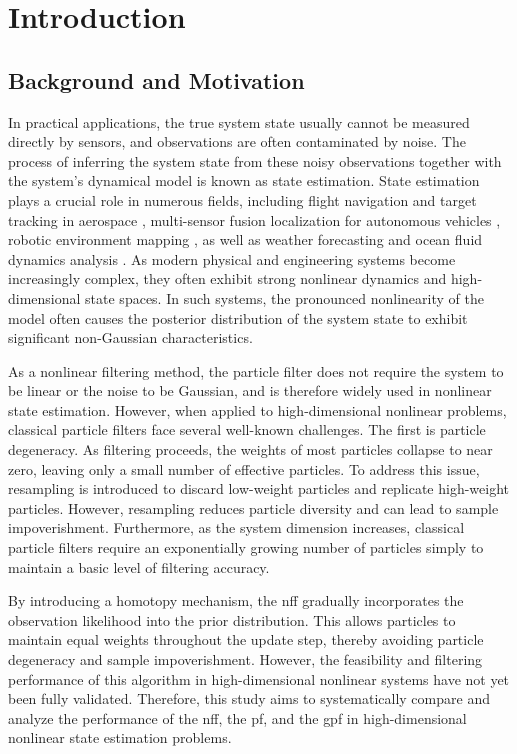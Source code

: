 \chapter{Introduction}
\label{chap:introduction}

\section{Background and Motivation}

In practical applications, the true system state usually cannot be measured directly by sensors, and observations are often contaminated by noise. The process of inferring the system state from these noisy observations together with the system's dynamical model is known as state estimation. State estimation plays a crucial role in numerous fields, including flight navigation and target tracking in aerospace \cite{Mourikis2007, Singer1970}, multi-sensor fusion localization for autonomous vehicles \cite{Mourikis2007}, robotic environment mapping \cite{Grisetti2007}, as well as weather forecasting and ocean fluid dynamics analysis \cite{Houtekamer1998}. As modern physical and engineering systems become increasingly complex, they often exhibit strong nonlinear dynamics and high-dimensional state spaces. In such systems, the pronounced nonlinearity of the model often causes the posterior distribution of the system state to exhibit significant non-Gaussian characteristics.

As a nonlinear filtering method, the particle filter\cite{PF01} does not require the system to be linear or the noise to be Gaussian, and is therefore widely used in nonlinear state estimation. However, when applied to high-dimensional nonlinear problems, classical particle filters face several well-known challenges. The first is particle degeneracy. As filtering proceeds, the weights of most particles collapse to near zero, leaving only a small number of effective particles. To address this issue, resampling is introduced to discard low-weight particles and replicate high-weight particles. However, resampling reduces particle diversity and can lead to sample impoverishment. Furthermore, as the system dimension increases, classical particle filters require an exponentially growing number of particles simply to maintain a basic level of filtering accuracy.

By introducing a homotopy mechanism\cite{Homotopy01,Homotopy02}, the \ac{nff} gradually incorporates the observation likelihood into the prior distribution. This allows particles to maintain equal weights throughout the update step, thereby avoiding particle degeneracy and sample impoverishment. However, the feasibility and filtering performance of this algorithm in high-dimensional nonlinear systems have not yet been fully validated. Therefore, this study aims to systematically compare and analyze the performance of the \ac{nff}, the \ac{pf}, and the \ac{gpf} in high-dimensional nonlinear state estimation problems.

